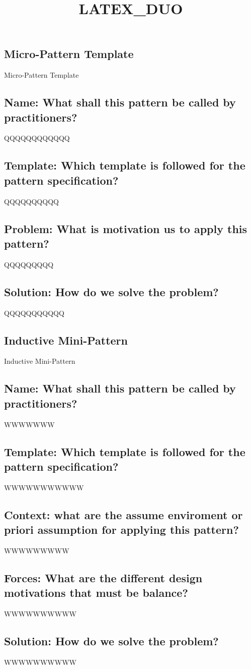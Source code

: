 
\title{LATEX_DUO}
\maketitle
\subsection{Micro-Pattern Template}
Micro-Pattern Template
\subsection{Name: What shall this pattern be called by practitioners?}
QQQQQQQQQQQQ
\subsection{Template: Which template is followed for the pattern specification?}
QQQQQQQQQQ
\subsection{Problem: What is motivation us to apply this pattern?}
QQQQQQQQQ
\subsection{Solution: How do we solve the problem?}
QQQQQQQQQQQ
\subsection{Inductive Mini-Pattern}
Inductive Mini-Pattern
\subsection{Name: What shall this pattern be called by practitioners?}
WWWWWWW
\subsection{Template: Which template is followed for the pattern specification?}
WWWWWWWWWWW
\subsection{Context: what are the assume enviroment or priori assumption for applying this pattern?}
WWWWWWWWW
\subsection{Forces: What are the different design motivations that must be balance?}
WWWWWWWWWW
\subsection{Solution: How do we solve the problem?}
WWWWWWWWWW

